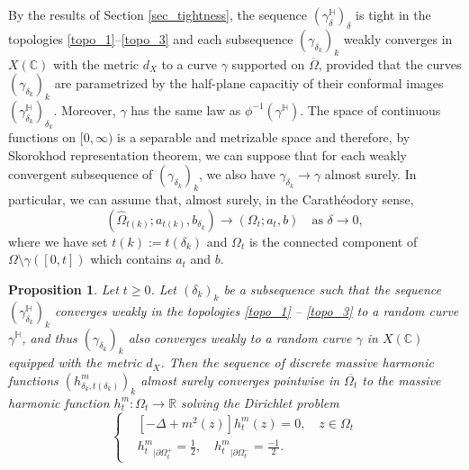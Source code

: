 \documentclass{article}
\newcommand{\HH}{{\mathbb{H}}}
\newtheorem{proposition}[theorem]{Proposition}
\theoremstyle{definition}
\theoremstyle{remark}
\theoremstyle{remark}
\begin{document}
By the results of Section \ref{sec_tightness}, the sequence $(\gamma_{\delta}^{\HH})_{\delta}$ is tight in the topologies \eqref{topo_1}--\eqref{topo_3} and each subsequence $(\gamma_{\delta_k})_k$ weakly converges in $X(\mathbb{C})$ with the metric $d_X$ to a curve $\gamma$ supported on $\overline{\Omega}$, provided that the curves $(\gamma_{\delta_k})_k$ are parametrized by the half-plane capacitiy of their conformal images $(\gamma_{\delta_k}^{\HH})_{\delta_k}$. Moreover, $\gamma$ has the same law as $\phi^{-1}(\gamma^{\HH})$. The space of continuous functions on $[0,\infty)$ is a separable and metrizable space and therefore, by Skorokhod representation theorem, we can suppose that for each weakly convergent subsequence of $(\gamma_{\delta_k})_k$, we also have $\gamma_{\delta_k} \to \gamma$ almost surely. In particular, we can assume that, almost surely, in the Carath\'eodory sense,
\begin{equation*}
     (\hat \Omega_{t(k)}; a_{t(k)}, b_{\delta_k}) \to (\Omega_t;a_t,b) \quad \text{as } \delta \to 0,
\end{equation*}
where we have set $t(k):= t(\delta_k)$ and $\Omega_t$ is the connected component of $\Omega \setminus \gamma([0,t])$ which contains $a_t$ and $b$.

\begin{proposition} \label{prop_cvg_martingale}
Let $t \geq 0$. Let $(\delta_k)_{k}$ be a subsequence such that the sequence $(\gamma_{\delta_k}^{\HH})_k$ converges weakly in the topologies \eqref{topo_1} -- \eqref{topo_3} to a random curve $\gamma^{\HH}$, and thus $(\gamma_{\delta_k})_{k}$ also converges weakly to a random curve $\gamma$ in $X(\mathbb{C})$ equipped with the metric $d_X$. Then the sequence of discrete massive harmonic functions $(h_{\delta_{k}, t(\delta_k)}^m)_k$ almost surely converges pointwise in $\overline{\Omega_t}$ to the massive harmonic function $h_t^m: \Omega_t \to \mathbb{R}$ solving the Dirichlet problem
\begin{equation*}
    \begin{cases}
    &[-\Delta + m^2(z)]h_t^m(z) = 0, \quad z \in \Omega_t \\
    &{h_t^m}_{\vert \partial \Omega_t^{+}} = \frac{1}{2}, \quad {h_t^m}_{\vert \partial \Omega_t^{-}} = \frac{-1}{2}.
    \end{cases}
\end{equation*}
\end{proposition}
\end{document}
